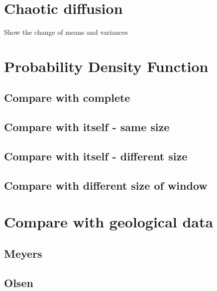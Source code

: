 \documentclass{article}
\begin{document}
\section{Chaotic diffusion}
Show the change of means and variances
\section{Probability Density Function}
\subsection{Compare with complete }
\subsection{Compare with itself - same size }
\subsection{Compare with itself - different size}
\subsection{Compare with different size of window}
\section{Compare with geological data}
\subsection{Meyers}
\subsection{Olsen}

\newpage


\end{document}
